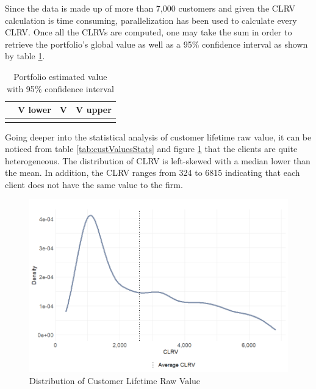 \documentclass[
]{book}
\begin{document}
Since the data is made up of more than 7,000 customers and given the CLRV calculation is time consuming, parallelization has been used to calculate every CLRV. Once all the CLRVs are computed, one may take the sum in order to retrieve the portfolio's global value as well as a 95\% confidence interval as shown by table \ref{tab:custValuesSum}.

\begin{table}[H]

\caption{\label{tab:custValuesSum}Portfolio estimated value with 95$\%$ confidence interval}
\centering
\begin{tabular}[t]{llll}
\toprule
  & V lower & V & V upper\\
\midrule
\cellcolor{gray!6}{} & \cellcolor{gray!6}{17,604,144} & \cellcolor{gray!6}{18,270,000} & \cellcolor{gray!6}{19,031,648}\\
\bottomrule
\end{tabular}
\end{table}

Going deeper into the statistical analysis of customer lifetime raw value, it can be noticed from table \ref{tab:custValuesStats} and figure \ref{fig:clrvDens} that the clients are quite heterogeneous. The distribution of CLRV is left-skewed with a median lower than the mean. In addition, the CLRV ranges from 324 to 6815 indicating that each client does not have the same value to the firm.

\begin{figure}

{\centering \includegraphics[width=12.5in]{./imgs/clrv_density} 

}

\caption{Distribution of Customer Lifetime Raw Value}\label{fig:clrvDens}
\end{figure}
\end{document}
